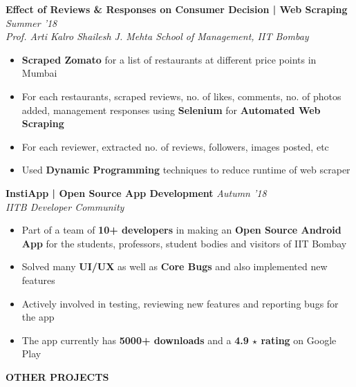 \documentclass[11pt]{article}%
\begin{document}
{\flushleft \bf \large{Effect of Reviews \& Responses on Consumer Decision | Web Scraping}} \hfill {{{\em{Summer '18}}}} \\
{\em{Prof. Arti Kalro \textbar Shailesh J. Mehta School of Management, IIT Bombay}}
\vspace{-1mm}
\begin{itemize}
\setlength\itemsep{0.01em}
\vspace{-1mm}
\item {\bf Scraped Zomato} for a list of restaurants at different price points in Mumbai
\vspace{-1mm}
\item For each restaurants, scraped reviews, no. of likes, comments, no. of photos added, management responses using {\bf Selenium} for {\bf Automated Web Scraping}
\vspace{-1mm}
\item For each reviewer, extracted no. of reviews, followers, images posted, etc
\vspace{-1mm}
\item Used {\bf Dynamic Programming} techniques to reduce runtime of web scraper
\end{itemize}
\vspace{-0.5cm}

{\flushleft \bf \large{InstiApp | Open Source App Development}}   \hfill {{\em{Autumn '18} }}\\
{\em{IITB Developer Community}}
\begin{itemize}
\vspace{-2mm}
\setlength\itemsep{0.01em}
\item Part of a team of {\bf 10+ developers} in making an {\bf Open Source Android App} for the students, professors, student bodies and visitors of IIT Bombay
\vspace{-1.2mm}
\item Solved many {\bf UI/UX} as well as {\bf Core Bugs} and also implemented new features
\vspace{-1.2mm}
\item Actively involved in testing, reviewing new features and reporting bugs for the app
\vspace{-1.2mm}
\item The app currently has {\bf 5000+ downloads} and a {\bf 4.9 $\star$ rating} on Google Play
\end{itemize}
\vspace{-0.5cm}


\pagebreak
\begin{flushleft}
\vspace{0mm}
\bf{\LARGE{O}\Large{THER} \LARGE{P}\Large{ROJECTS}}
\end{flushleft}
\vspace{-7mm}
\hrulefill
\vspace{-3mm}
\end{document}
